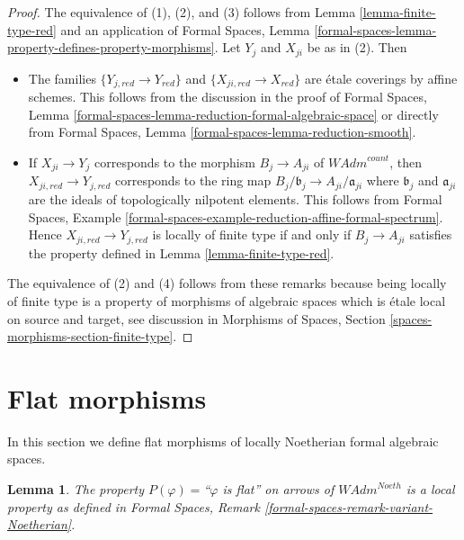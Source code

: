 \documentclass{stacks-project}
\theoremstyle{plain}
\newtheorem{lemma}[subsection]{Lemma}
\theoremstyle{definition}
\theoremstyle{remark}
\numberwithin{equation}{subsection}
\begin{document}
\begin{proof}
The equivalence of (1), (2), and (3) follows from
Lemma \ref{lemma-finite-type-red} and an application of
Formal Spaces, Lemma
\ref{formal-spaces-lemma-property-defines-property-morphisms}.
Let $Y_j$ and $X_{ji}$ be as in (2). Then
\begin{itemize}
\item The families $\{Y_{j, red} \to Y_{red}\}$ and
$\{X_{ji, red} \to X_{red}\}$ are \'etale coverings by affine schemes.
This follows from the discussion in the proof of
Formal Spaces, Lemma
\ref{formal-spaces-lemma-reduction-formal-algebraic-space}
or directly from
Formal Spaces, Lemma \ref{formal-spaces-lemma-reduction-smooth}.
\item If $X_{ji} \to Y_j$ corresponds to the morphism
$B_j \to A_{ji}$ of $\textit{WAdm}^{count}$, then
$X_{ji, red} \to Y_{j, red}$ corresponds to the ring map
$B_j/\mathfrak b_j \to A_{ji}/\mathfrak a_{ji}$ where
$\mathfrak b_j$ and $\mathfrak a_{ji}$ are the ideals of
topologically nilpotent elements. This follows from
Formal Spaces, Example
\ref{formal-spaces-example-reduction-affine-formal-spectrum}.
Hence $X_{ji, red} \to Y_{j, red}$ is locally of finite type
if and only if $B_j \to A_{ji}$ satisfies the
property defined in Lemma \ref{lemma-finite-type-red}.
\end{itemize}
The equivalence of (2) and (4) follows from these remarks because
being locally of finite type is a property of morphisms of algebraic
spaces which is \'etale local on source and target, see discussion in
Morphisms of Spaces, Section \ref{spaces-morphisms-section-finite-type}.
\end{proof}


















\section{Flat morphisms}
\label{section-flat}

\noindent
In this section we define flat morphisms of locally Noetherian formal
algebraic spaces.

\begin{lemma}
\label{lemma-flat-axioms}
The property $P(\varphi)=$``$\varphi$ is flat'' on arrows
of $\textit{WAdm}^{Noeth}$ is a local property as defined in
Formal Spaces, Remark \ref{formal-spaces-remark-variant-Noetherian}.
\end{lemma}
\end{document}

